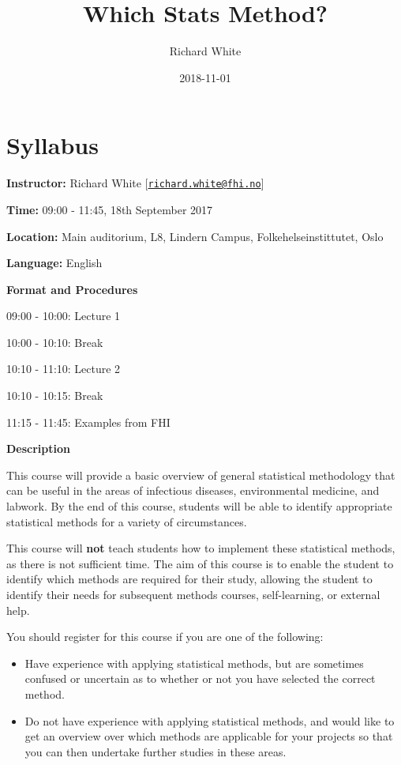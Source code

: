 \documentclass[12pt,]{article}
\title{Which Stats Method?}
\author{Richard White}
\date{2018-11-01}
\providecommand{\tightlist}{%
  \setlength{\itemsep}{0pt}\setlength{\parskip}{0pt}}
\begin{document}
\maketitle

{
\hypersetup{linkcolor=black}
\setcounter{tocdepth}{2}
\tableofcontents
}
\listoftables
\listoffigures
\section*{Syllabus}\label{syllabus}

\textbf{Instructor:} Richard White
{[}\href{mailto:richard.white@fhi.no}{\nolinkurl{richard.white@fhi.no}}{]}

\textbf{Time:} 09:00 - 11:45, 18th September 2017

\textbf{Location:} Main auditorium, L8, Lindern Campus,
Folkehelseinstittutet, Oslo

\textbf{Language:} English

\textbf{Format and Procedures}

09:00 - 10:00: Lecture 1

10:00 - 10:10: Break

10:10 - 11:10: Lecture 2

10:10 - 10:15: Break

11:15 - 11:45: Examples from FHI

\textbf{Description}

This course will provide a basic overview of general statistical
methodology that can be useful in the areas of infectious diseases,
environmental medicine, and labwork. By the end of this course, students
will be able to identify appropriate statistical methods for a variety
of circumstances.

This course will \textbf{not} teach students how to implement these
statistical methods, as there is not sufficient time. The aim of this
course is to enable the student to identify which methods are required
for their study, allowing the student to identify their needs for
subsequent methods courses, self-learning, or external help.

You should register for this course if you are one of the following:

\begin{itemize}
\tightlist
\item
  Have experience with applying statistical methods, but are sometimes
  confused or uncertain as to whether or not you have selected the
  correct method.
\item
  Do not have experience with applying statistical methods, and would
  like to get an overview over which methods are applicable for your
  projects so that you can then undertake further studies in these
  areas.
\end{itemize}
\end{document}
